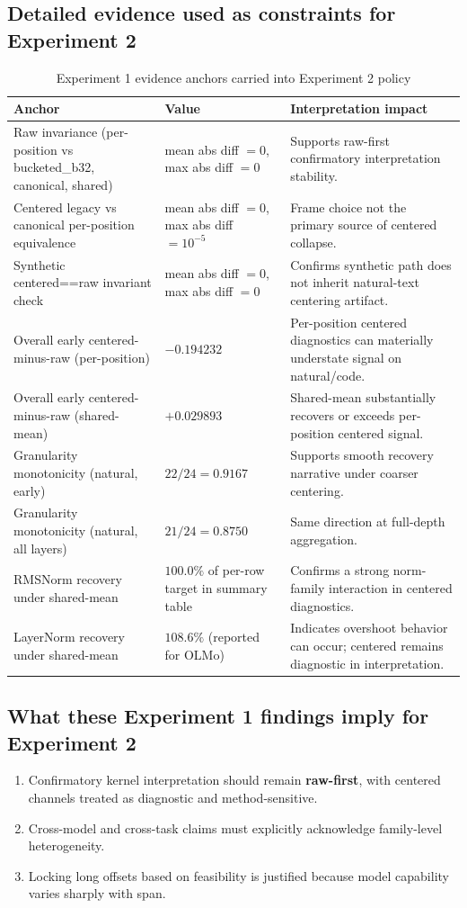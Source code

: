 \documentclass[11pt]{article}
\begin{document}
\subsection*{Detailed evidence used as constraints for Experiment 2}
\begin{table}[ht]
\centering
\caption{Experiment 1 evidence anchors carried into Experiment 2 policy}
\begin{tabularx}{\textwidth}{L{0.33\textwidth}L{0.17\textwidth}Y}
\toprule
\textbf{Anchor} & \textbf{Value} & \textbf{Interpretation impact} \\
\midrule
Raw invariance (per-position vs bucketed\_b32, canonical, shared) & mean abs diff $=0$, max abs diff $=0$ & Supports raw-first confirmatory interpretation stability. \\
Centered legacy vs canonical per-position equivalence & mean abs diff $=0$, max abs diff $=10^{-5}$ & Frame choice not the primary source of centered collapse. \\
Synthetic centered==raw invariant check & mean abs diff $=0$, max abs diff $=0$ & Confirms synthetic path does not inherit natural-text centering artifact. \\
Overall early centered-minus-raw (per-position) & $-0.194232$ & Per-position centered diagnostics can materially understate signal on natural/code. \\
Overall early centered-minus-raw (shared-mean) & $+0.029893$ & Shared-mean substantially recovers or exceeds per-position centered signal. \\
Granularity monotonicity (natural, early) & $22/24 = 0.9167$ & Supports smooth recovery narrative under coarser centering. \\
Granularity monotonicity (natural, all layers) & $21/24 = 0.8750$ & Same direction at full-depth aggregation. \\
RMSNorm recovery under shared-mean & $100.0\%$ of per-row target in summary table & Confirms a strong norm-family interaction in centered diagnostics. \\
LayerNorm recovery under shared-mean & $108.6\%$ (reported for OLMo) & Indicates overshoot behavior can occur; centered remains diagnostic in interpretation. \\
\bottomrule
\end{tabularx}
\end{table}

\subsection*{What these Experiment 1 findings imply for Experiment 2}
\begin{enumerate}[leftmargin=*]
  \item Confirmatory kernel interpretation should remain \textbf{raw-first}, with centered channels treated as diagnostic and method-sensitive.
  \item Cross-model and cross-task claims must explicitly acknowledge family-level heterogeneity.
  \item Locking long offsets based on feasibility is justified because model capability varies sharply with span.
\end{enumerate}
\end{document}
